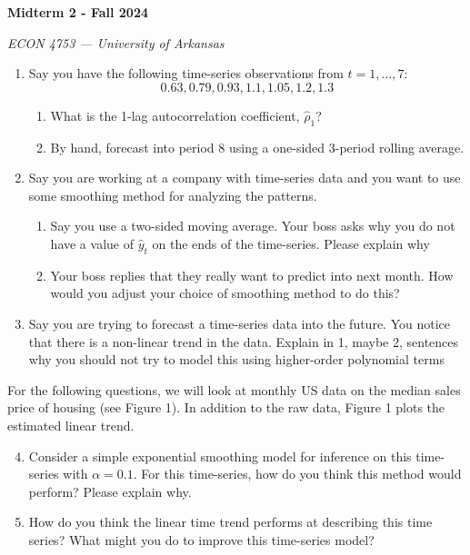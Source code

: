\documentclass[12pt]{article}
\begin{document}
\begin{center}
  {\Huge\bf Midterm 2 - Fall 2024}
  
  \smallskip
  {\large\it ECON 4753 — University of Arkansas}
\end{center}

\vspace{5mm}
\begin{enumerate}
  \item Say you have the following time-series observations from $t = 1, \dots, 7$:
  \vspace*{-\bigskipamount}
  $$
    0.63, 0.79, 0.93, 1.1, 1.05, 1.2, 1.3
  $$

  \begin{enumerate}
    \item What is the 1-lag autocorrelation coefficient, $\hat{\rho}_1$?
      
    \item By hand, forecast into period $8$ using a one-sided 3-period rolling average.
  \end{enumerate}
  
  \item Say you are working at a company with time-series data and you want to use some smoothing method for analyzing the patterns. 
  \begin{enumerate}
    \item Say you use a two-sided moving average. Your boss asks why you do not have a value of $\hat{y}_t$ on the ends of the time-series. Please explain why
    
    \item Your boss replies that they really want to predict into next month. How would you adjust your choice of smoothing method to do this?
  \end{enumerate}

  \item Say you are trying to forecast a time-series data into the future. You notice that there is a non-linear trend in the data. Explain in 1, maybe 2, sentences why you should not try to model this using higher-order polynomial terms
\end{enumerate}

\bigskip\bigskip
\noindent For the following questions, we will look at monthly US data on the median sales price of housing (see Figure 1). In addition to the raw data, Figure 1 plots the estimated linear trend.

\begin{enumerate}
  \setcounter{enumi}{3}
  \item Consider a simple exponential smoothing model for inference on this time-series with $\alpha = 0.1$. For this time-series, how do you think this method would perform? Please explain why.
  
  \item How do you think the linear time trend performs at describing this time series? What might you do to improve this time-series model?
\end{enumerate}
\end{document}
